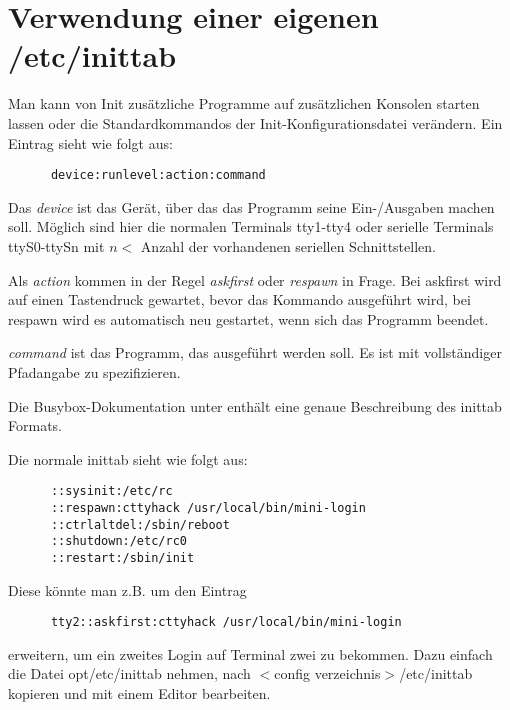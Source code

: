 \section{Verwendung einer eigenen /etc/inittab}

  Man kann von Init zusätzliche Programme auf
  zusätzlichen Konsolen starten lassen oder die Standardkommandos der
  Init-Konfigurationsdatei verändern. Ein Eintrag sieht wie folgt
  aus:

  \begin{example}
    \begin{verbatim}
      device:runlevel:action:command
    \end{verbatim}
  \end{example}

  Das \emph{device} ist das Gerät, über das das Programm seine
  Ein-/Ausgaben machen soll. Möglich sind hier die normalen Terminals
  tty1-tty4 oder serielle Terminals ttyS0-ttySn mit $n <$ Anzahl der
  vorhandenen seriellen Schnittstellen.

  Als \emph{action} kommen in der Regel \emph{askfirst} oder \emph{respawn} 
  in Frage. Bei askfirst wird auf einen Tastendruck
  gewartet, bevor das Kommando ausgeführt wird, bei respawn wird es
  automatisch neu gestartet, wenn sich das Programm beendet.

  \emph{command} ist das Programm, das ausgeführt werden soll. Es
  ist mit vollständiger Pfadangabe zu spezifizieren.

  Die Busybox-Dokumentation unter  enthält eine
  genaue Beschreibung des inittab Formats.

  Die normale inittab sieht wie folgt aus:

  \begin{example}
    \begin{verbatim}
      ::sysinit:/etc/rc
      ::respawn:cttyhack /usr/local/bin/mini-login
      ::ctrlaltdel:/sbin/reboot
      ::shutdown:/etc/rc0
      ::restart:/sbin/init
    \end{verbatim}
  \end{example}

  Diese könnte man z.B. um den Eintrag

  \begin{example}
    \begin{verbatim}
      tty2::askfirst:cttyhack /usr/local/bin/mini-login
    \end{verbatim}
  \end{example}

  erweitern, um ein zweites Login auf Terminal zwei zu bekommen. Dazu
  einfach die Datei opt/etc/inittab nehmen, nach $<$config
  verzeichnis$>$/etc/inittab kopieren und mit einem Editor bearbeiten.
